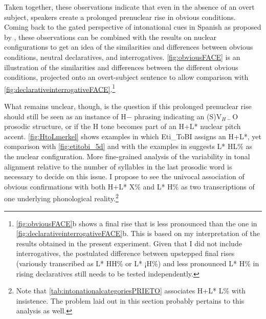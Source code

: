 
Taken together, these observations indicate that even in the absence of an overt subject, speakers create a prolonged prenuclear rise in obvious conditions. Coming back to the gated perspective of intonational cues in Spanish as proposed by \citet{Face2007}, these observations can be combined with the results on nuclear configurations to get an idea of the similarities and differences between obvious conditions, neutral declaratives, and interrogatives. \autoref{fig:obviousFACE} is an illustration of the similarities and differences between the different obvious conditions, projected onto an overt-subject sentence to allow comparison with \autoref{fig:declarativeinterrogativeFACE}.\footnote{\autoref{fig:obviousFACE}b shows a final rise that is less pronounced than the one in \autoref{fig:declarativeinterrogativeFACE}b. This is based on my interpretation of the results obtained in the present experiment. Given that I did not include interrogatives, the postulated difference between upstepped final rises (variously transcribed as L* HH\% or L* ¡H\%) and less pronounced L* H\% in rising declaratives still needs to be tested independently.}

What remains unclear, though, is the question if this prolonged prenuclear rise should still be seen as an instance of H$-$ phrasing indicating an (S)V$_{H-}$O prosodic structure, or if the H tone becomes part of an H+L* nuclear pitch accent. \autoref{fig:HtoLmerkel} shows examples in which Eti\_ToBI assigns an H+L*, yet comparison with \autoref{fig:etitobi_5d} and with the examples in  suggests L* HL\% as the nuclear configuration. More fine-grained analysis of the variability in tonal alignment relative to the number of syllables in the last prosodic word is necessary to decide on this issue. I propose to see the univocal association of obvious confirmations with both H+L* X\% and L* H\% as two transcriptions of one underlying phonological reality.\footnote{Note that \autoref{tab:intonationalcategoriesPRIETO} associates H+L* L\% with insistence. The problem laid out in this section probably pertains to this analysis as well.}


